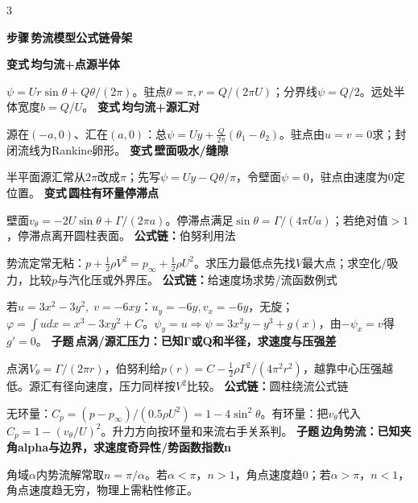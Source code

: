 \documentclass[a4paper]{article}
\newcommand{\form}[1]{{\color{M}\bfseries 公式链：}#1\par}
\newcommand{\labtag}[3]{{\bfseries\color{#1}\colorbox{#1}{\color{white}\fontsize{2.35}{2.48}\selectfont #2}\,#3}\par}
\newcommand{\subt}[1]{\labtag{Q}{子题}{#1}}
\newcommand{\var}[1]{\labtag{V}{变式}{#1}}
\newcommand{\step}[1]{\labtag{S}{步骤}{#1}}
\newcommand{\subq}[1]{\subt{#1}}
\newcommand{\varq}[1]{\var{#1}}
\newcommand{\stepq}[1]{\step{#1}}
\newcommand{\formq}[1]{\form{#1}}
\newenvironment{vfourWrap}{\par\begingroup\fontsize{2.68}{2.84}\selectfont\setlength{\fboxsep}{0.45pt}}{\par\endgroup}
\begin{document}
\begin{multicols}{3}
\begin{vfourWrap}
\stepq{势流模型公式链骨架}
\varq{均匀流+点源半体}
$\psi=Ur\sin\theta+Q\theta/(2\pi)$。驻点$\theta=\pi,r=Q/(2\pi U)$；分界线$\psi=Q/2$。远处半体宽度$b=Q/U$。
\varq{均匀流+源汇对}
源在$(-a,0)$、汇在$(a,0)$：总$\psi=Uy+\frac{Q}{2\pi}(\theta_1-\theta_2)$。驻点由$u=v=0$求；封闭流线为Rankine卵形。
\varq{壁面吸水/缝隙}
半平面源汇常从$2\pi$改成$\pi$；先写$\psi=Uy-Q\theta/\pi$，令壁面$\psi=0$，驻点由速度为0定位置。
\varq{圆柱有环量停滞点}
壁面$v_\theta=-2U\sin\theta+\Gamma/(2\pi a)$。停滞点满足$\sin\theta=\Gamma/(4\pi Ua)$；若绝对值$>1$，停滞点离开圆柱表面。
\formq{伯努利用法}
势流定常无粘：$p+\frac12\rho V^2=p_\infty+\frac12\rho U^2$。求压力最低点先找$V$最大点；求空化/吸力，比较$p$与汽化压或外界压。
\formq{给速度场求势/流函数例式}
若$u=3x^2-3y^2,\;v=-6xy$：$u_y=-6y,v_x=-6y$，无旋；$\varphi=\int u dx=x^3-3xy^2+C$。$\psi_y=u\Rightarrow \psi=3x^2y-y^3+g(x)$，由$-\psi_x=v$得$g'=0$。
\subq{点涡/源汇压力：已知Γ或Q和半径，求速度与压强差}
点涡$V_\theta=\Gamma/(2\pi r)$，伯努利给$p(r)=C-\frac12\rho\Gamma^2/(4\pi^2r^2)$，越靠中心压强越低。源汇有径向速度，压力同样按$V^2$比较。
\formq{圆柱绕流公式链}
无环量：$C_p=(p-p_\infty)/(0.5\rho U^2)=1-4\sin^2\theta$。有环量：把$v_\theta$代入$C_p=1-(v_\theta/U)^2$。升力方向按环量和来流右手关系判。
\subq{边角势流：已知夹角alpha与边界，求速度奇异性/势函数指数n}
角域$\alpha$内势流解常取$n=\pi/\alpha$。若$\alpha<\pi$，$n>1$，角点速度趋0；若$\alpha>\pi$，$n<1$，角点速度趋无穷，物理上需粘性修正。


\end{vfourWrap}
\end{multicols}
\end{document}
